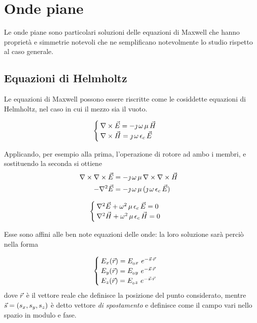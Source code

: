 \chapter{Onde piane}
Le onde piane sono particolari soluzioni delle equazioni di Maxwell che hanno proprietà e simmetrie notevoli che ne semplificano notevolmente lo studio rispetto al caso generale.

\section{Equazioni di Helmholtz}
	Le equazioni di Maxwell possono essere riscritte come le cosiddette equazioni di Helmholtz, nel caso in cui il mezzo sia il vuoto.

	\begin{equation*}
		\begin{cases}
			\nabla\times\vec{E} = - \jmath \, \omega \, \mu \, \vec{H} \\
			\nabla\times\vec{H} = \jmath \, \omega \, \epsilon_c \, \vec{E} \\
		\end{cases}
	\end{equation*}

	Applicando, per esempio alla prima, l'operazione di rotore ad ambo i membri, e sostituendo la seconda si ottiene
	\begin{equation*}
		\begin{split}
			\nabla\times\nabla\times\vec{E} &= - \jmath \, \omega \, \mu \, \nabla\times \nabla\times\vec{H} \\
			- \nabla^2\vec{E} &= - \jmath \, \omega \, \mu \, (\jmath \, \omega \, \epsilon_c \, \vec{E})\\
		\end{split}
	\end{equation*}

	\begin{equation} \label{eq:helmotz}
		\begin{cases}
			\nabla^2 \vec{E} + \omega^2 \, \mu \, \epsilon_c \, \vec{E} = 0 \\
			\nabla^2 \vec{H} + \omega^2 \, \mu \, \epsilon_c \, \vec{H} = 0
		\end{cases}
	\end{equation}

	Esse sono affini alle ben note equazioni delle onde: la loro soluzione sarà perciò nella forma

	\begin{equation} \label{eq:helmotz_sol}
		\begin{cases}
			E_x(\vec{r}) = E_{_{0}x} ~ e^{-\vec{s} \cdot \vec{r}} \\
			E_y(\vec{r}) = E_{_{0}y} ~ e^{-\vec{s} \cdot \vec{r}} \\
			E_z(\vec{r}) = E_{_{0}z} ~ e^{-\vec{s} \cdot \vec{r}}
		\end{cases}
	\end{equation}
	dove $\vec{r}$ è il vettore reale che definisce la posizione del punto considerato, mentre $\vec{s} = (s_x, s_y, s_z)$ è detto vettore \emph{di spostamento} e definisce come il campo vari nello spazio in modulo e fase.

